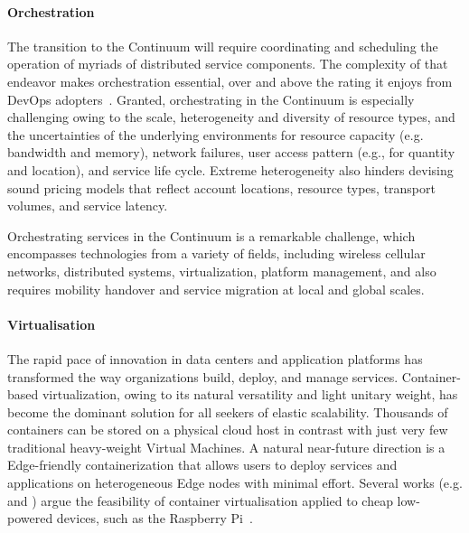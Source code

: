 \paragraph{Orchestration}
The transition to the Continuum will require coordinating and scheduling the operation of myriads of distributed service components. The complexity of that endeavor makes orchestration essential, over and above the rating it enjoys from DevOps adopters~\cite{nygren2010akamai}. 
Granted, orchestrating in the Continuum is especially challenging owing to the scale, heterogeneity and diversity of resource types, and the uncertainties of the underlying environments for resource capacity (e.g. bandwidth and memory), network failures, user access pattern (e.g., for quantity and location), and service life cycle.
Extreme heterogeneity also hinders devising sound pricing models that reflect account locations, resource types, transport volumes, and service latency.

Orchestrating services in the Continuum is a remarkable challenge, which encompasses technologies from a variety of fields, including wireless cellular networks, distributed systems, virtualization, platform management, and also requires mobility handover and service migration at local and global scales.

\paragraph{Virtualisation}
\label{sec:virtualisation}

The rapid pace of innovation in data centers and application platforms has transformed the way organizations build, deploy, and manage services.
Container-based virtualization, owing to its natural versatility and light unitary weight, has become the dominant solution for all seekers of elastic scalability.
Thousands of containers can be stored on a physical cloud host in contrast with just very few traditional heavy-weight Virtual Machines. 
A natural near-future direction is a Edge-friendly containerization that allows users to deploy services and applications on heterogeneous Edge nodes with minimal effort. 
Several works (e.g. \cite{pahl2016container} and \cite{bellavista2017feasibility}) argue the feasibility of container virtualisation applied to cheap low-powered devices, such as the Raspberry Pi~\cite{raspberry}. 

